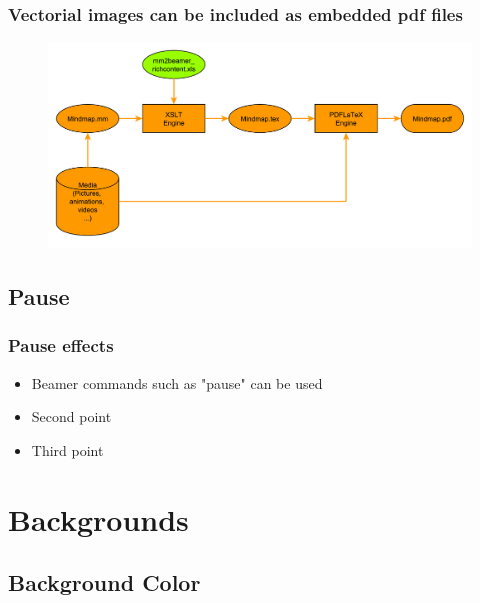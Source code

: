 \documentclass[usepdftitle=false,professionalfonts,compress ]{beamer}
\begin{document}
{
\begin{frame}\frametitle{Vectorial images can be included as embedded pdf files}

\begin{figure}
	\includegraphics[width=.97\textwidth]{diagram.pdf}\end{figure}
\end{frame}
}



\subsection{Pause}

{
\begin{frame}\frametitle{Pause effects}
	\begin{itemize}

		\item Beamer commands such as "pause" can be used \pause
		\item Second point \pause
		\item     Third point
	\end{itemize}

\end{frame}
}






\section{Backgrounds}
		
\subsection{Background Color}
\end{document}
